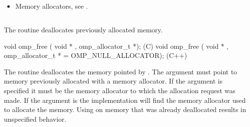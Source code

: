 \crossreferences
\begin{itemize}
\item Memory allocators, see .
\end{itemize}

\subsection{}
\label{subsec:omp_free}

\summary
The  routine deallocates previously allocated memory. 

\format

\begin{boxedcode}
void omp_free ( void * , omp\_allocator\_t *);        (C)
void omp_free ( void * , 
             omp\_allocator\_t * = OMP_NULL_ALLOCATOR); (C++)
\end{boxedcode}

\effect

The  routine deallocates the memory pointed by . The  argument must point to memory previously allocated with a memory allocator. If the  argument is specified it must be the memory allocator to which the allocation request was made. If the  argument is  the implementation will find the memory allocator used to allocate the memory. Using  on memory that was already deallocated results in unspecified behavior.

\ccppspecificend
